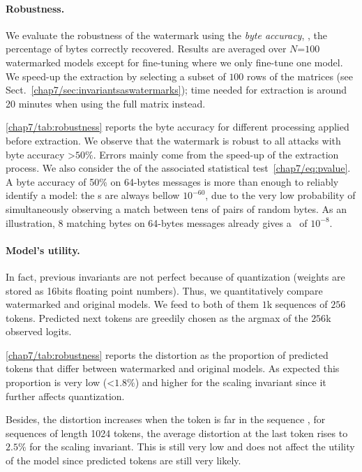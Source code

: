 \paragraph*{Robustness.}
We evaluate the robustness of the watermark using the \emph{byte accuracy}, \ie, the percentage of bytes correctly recovered.
Results are averaged over $N$=$100$ watermarked models except for fine-tuning where we only fine-tune one model.
We speed-up the extraction by selecting a subset of $100$ rows of the matrices (see Sect.~\ref{chap7/sec:invariantsaswatermarks}); 
time needed for extraction is around 20 minutes when using the full matrix instead.

\autoref{chap7/tab:robustness} reports the byte accuracy for different processing applied before extraction.
We observe that the watermark is robust to all attacks with byte accuracy >$50\%$.
Errors mainly come from the speed-up of the extraction process.
We also consider the \emph{\pval} of the associated statistical test~\eqref{chap7/eq:pvalue}.
A byte accuracy of 50\% on 64-bytes messages is more than enough to reliably identify a model: 
the \pval s are always bellow $10^{-60}$, due to the very low probability of simultaneously observing a match between tens of pairs of random bytes.
As an illustration, 8 matching bytes on 64-bytes messages already gives a \pval\ of $10^{-8}$.

\paragraph*{Model's utility.}
In fact, previous invariants are not perfect because of quantization (weights are stored as 16bits floating point numbers).
Thus, we quantitatively compare watermarked and original models.
We feed to both of them $1$k sequences of $256$ tokens.
Predicted next tokens are greedily chosen as the argmax of the $256$k observed logits.

\autoref{chap7/tab:robustness} reports the distortion as the proportion of predicted tokens that differ between watermarked and original models.
As expected this proportion is very low (<$1.8\%$) and higher for the scaling invariant since it further affects quantization.

Besides, the distortion increases when the token is far in the sequence \eg, for sequences of length 1024 tokens, the average distortion at the last token rises to $2.5\%$ for the scaling invariant.
This is still very low and does not affect the utility of the model since predicted tokens are still very likely.



